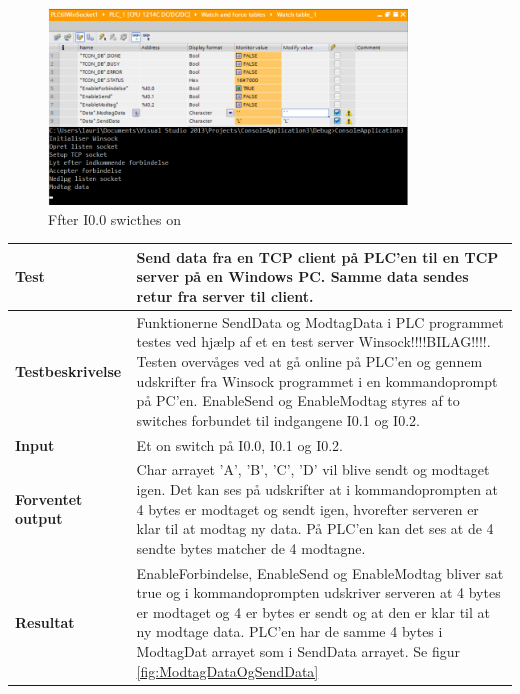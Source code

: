 \begin{figure}[H] %
	\centering
	\includegraphics[width=0.85\textwidth]{Test/ModultestStyringsenhed/OpretForbindelseEfter}
	\caption{Ffter I0.0 swicthes on}
	\label{fig:OpretForbindelseEfter}
\end{figure}

\begin{center}
	\begin{tabular}{ | m{} | m{}|} 
		\hline
		\textbf{Test}					&Send data fra en TCP client på PLC'en til en TCP server på en Windows PC. Samme data sendes retur fra server til client. \\ \hline
		\textbf{Testbeskrivelse}		&Funktionerne SendData og ModtagData i PLC programmet testes ved hjælp af et en test server Winsock!!!!BILAG!!!!. Testen overvåges ved at gå online på PLC'en og gennem udskrifter fra Winsock programmet i en kommandoprompt på PC'en. EnableSend og EnableModtag styres af to switches forbundet til indgangene I0.1 og I0.2. \\ \hline
		\textbf{Input}					& Et on switch på I0.0, I0.1 og I0.2.\\ \hline
		\textbf{Forventet output}		&Char arrayet 'A', 'B', 'C', 'D' vil blive sendt og modtaget igen. Det kan ses på udskrifter at i kommandoprompten at 4 bytes er modtaget og sendt igen, hvorefter serveren er klar til at modtag ny data. På PLC'en kan det ses at de 4 sendte bytes matcher de 4 modtagne.\\ \hline
		\textbf{Resultat}				&EnableForbindelse, EnableSend og EnableModtag bliver sat true og i kommandoprompten udskriver serveren at 4 bytes er modtaget og 4 er bytes er sendt og at den er klar til at ny modtage data. PLC'en har de samme 4 bytes i ModtagDat arrayet som i SendData arrayet. Se figur \ref{fig:ModtagDataOgSendData} \\ \hline
	\end{tabular}
\end{center}


